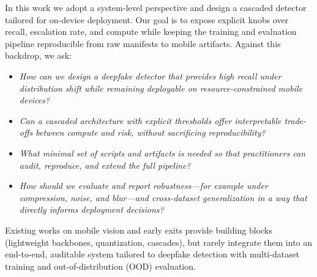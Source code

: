 In this work we adopt a system\hyp level perspective and design a cascaded detector tailored for on\hyp device deployment. Our goal is to expose explicit knobs over recall, escalation rate, and compute while keeping the training and evaluation pipeline reproducible from raw manifests to mobile artifacts. Against this backdrop, we ask:
\begin{itemize}[leftmargin=*,itemsep=2pt,parsep=0pt]
  \item \emph{How can we design a deepfake detector that provides high recall under distribution shift while remaining deployable on resource\hyp constrained mobile devices?}
  \item \emph{Can a cascaded architecture with explicit thresholds offer interpretable trade\hyp offs between compute and risk, without sacrificing reproducibility?}
  \item \emph{What minimal set of scripts and artifacts is needed so that practitioners can audit, reproduce, and extend the full pipeline?}
  \item \emph{How should we evaluate and report robustness---for example under compression, noise, and blur---and cross\hyp dataset generalization in a way that directly informs deployment decisions?}
\end{itemize}
Existing works on mobile vision and early exits provide building blocks (lightweight backbones, quantization, cascades), but rarely integrate them into an end\hyp to\hyp end, auditable system tailored to deepfake detection with multi\hyp dataset training and out\hyp of\hyp distribution (OOD) evaluation.

